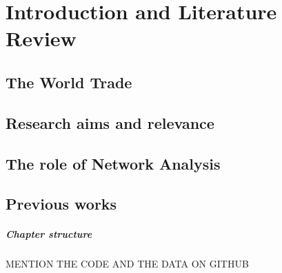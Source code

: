 \chapter{Introduction and Literature Review}

\section{The World Trade}
\section{Research aims and relevance}
\section{The role of Network Analysis}
\section{Previous works}

\paragraph{Chapter structure}
MENTION THE CODE AND THE DATA ON GITHUB





